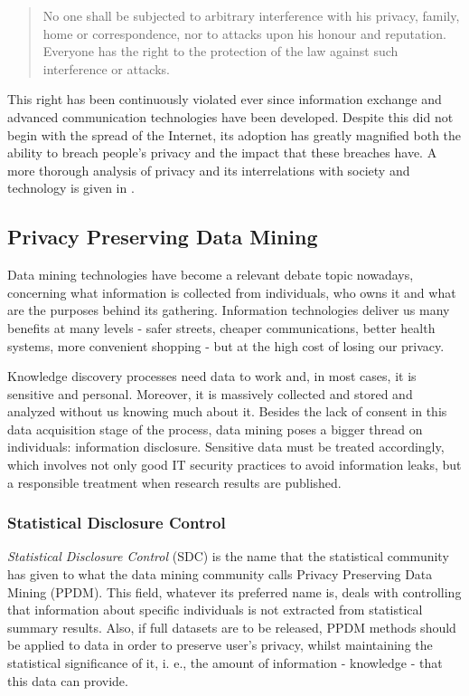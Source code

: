 \begin{quote}
	No one shall be subjected to arbitrary interference with his privacy, family, home or 
	correspondence, nor to attacks upon his honour and reputation. Everyone has the right to 
	the protection of the law against such interference or attacks.
\end{quote}

This right has been continuously violated ever since information exchange and advanced 
communication technologies have been developed. Despite this did not begin with the spread 
of the Internet, its adoption has greatly magnified both the ability to breach people’s privacy 
and the impact that these breaches have. A more thorough analysis of privacy and its interrelations
with society and technology is given in .

\subsection{Privacy Preserving Data Mining}

Data mining technologies have become a relevant debate topic nowadays, concerning what 
information is collected from individuals, who owns it and what are the purposes behind 
its gathering. Information technologies deliver us many benefits at many levels - safer 
streets, cheaper communications, better health systems, more convenient shopping - but 
at the high cost of losing our privacy.

Knowledge discovery processes need data to work and, in most cases, it is sensitive and 
personal. Moreover, it is massively collected and stored and analyzed without us knowing 
much about it. Besides the lack of consent in this data acquisition stage of the process, 
data mining poses a bigger thread on individuals: information disclosure. Sensitive data 
must be treated accordingly, which involves not only good IT security practices to avoid 
information leaks, but a responsible treatment when research results are published.

\subsubsection{Statistical Disclosure Control}

\textit{Statistical Disclosure Control} (SDC) is the name that the statistical community 
has given to what the data mining community calls Privacy Preserving Data Mining (PPDM). 
This field, whatever its preferred name is, deals with controlling that information about 
specific individuals is not extracted from statistical summary results. Also, if full 
datasets are to be released, PPDM methods should be applied to data in order to preserve 
user's privacy, whilst maintaining the statistical significance of it, i. e., the amount 
of information - knowledge - that this data can provide.